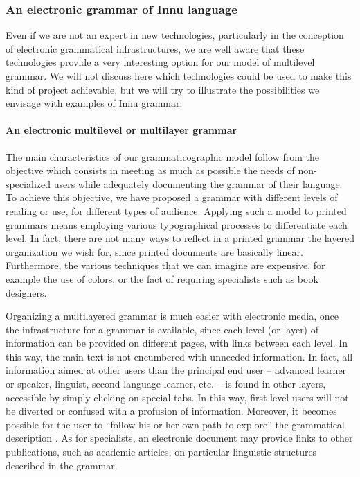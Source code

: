 \subsubsection{An electronic grammar of Innu language}
Even if we are not an expert in new technologies, particularly in the conception of electronic grammatical infrastructures, we are well aware that these technologies provide a very interesting option for our model of multilevel grammar. We will not discuss here which technologies could be used to make this kind of project achievable, but we will try to illustrate the possibilities we envisage with examples of Innu grammar.

\paragraph{An electronic multilevel or multilayer grammar}
The main characteris\-tics of our grammaticographic model follow from the objective which consists in meeting as much as possible the needs of non-specialized users while adequately documenting the grammar of their language. To achieve this objective, we have proposed a grammar with different levels of reading or use, for different types of audience. Applying such a model to printed grammars means employing various typographical processes to differentiate each level. In fact, there are not many ways to reflect in a printed grammar the layered organization we wish for, since printed documents are basically linear. Furthermore, the various techniques that we can imagine are expensive, for example the use of colors, or the fact of requiring specialists such as book designers.

Organizing a multilayered grammar is much easier with electronic media, once the infrastructure for a grammar is available, since each level (or layer) of information can be provided on different pages, with links between each level. In this way, the main text is not encumbered with unneeded information. In fact, all information aimed at other users than the principal end user -- advanced learner or speaker, linguist, second language learner, etc. -- is found in other layers, accessible by simply clicking on special tabs. In this way, first level users will not be diverted or confused with a profusion of information. Moreover, it becomes possible for the user to ``follow his or her own path to explore'' the grammatical description \citep[315]{Nordhoff2008}. As for specialists, an electronic document may provide links to other publications, such as academic articles, on particular linguistic structures described in the grammar.

